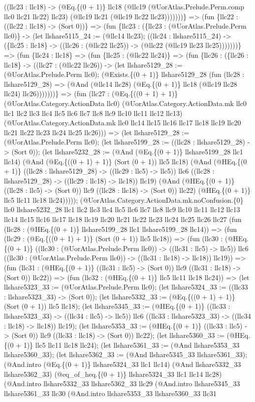 \documentclass[11pt]{article}
\begin{document}
((llc23 : llc18) -> (@Eq.\{(0 + 1)\} llc18 (@llc19 (@UorAtlas.Prelude.Perm.comp llc0 llc21 llc22) llc23) (@llc19 llc21 (@llc19 llc22 llc23)))))))\} => (fun \{llc22 : ((llc22 : llc18) -> (Sort 0))\} => (fun \{llc23 : (\{llc23 : (@UorAtlas.Prelude.Perm llc0)\} -> (let llshare5115\_24 := (@llc14 llc23); ((llc24 : llshare5115\_24) -> (\{llc25 : llc18\} -> ((llc26 : (@llc22 llc25)) -> (@llc22 (@llc19 llc23 llc25)))))))\} => (fun \{llc24 : llc18\} => (fun \{llc25 : (@llc22 llc24)\} => (fun \{llc26 : (\{llc26 : llc18\} -> ((llc27 : (@llc22 llc26)) -> (let llshare5129\_28 := (@UorAtlas.Prelude.Perm llc0); (@Exists.\{(0 + 1)\} llshare5129\_28 (fun (llc28 : llshare5129\_28) => (@And (@llc14 llc28) (@Eq.\{(0 + 1)\} llc18 (@llc19 llc28 llc24) llc26)))))))\} => (fun (llc27 : (@Eq.\{((0 + 1) + 1)\} (@UorAtlas.Category.ActionData llc0) (@UorAtlas.Category.ActionData.mk llc0 llc1 llc2 llc3 llc4 llc5 llc6 llc7 llc8 llc9 llc10 llc11 llc12 llc13) (@UorAtlas.Category.ActionData.mk llc0 llc14 llc15 llc16 llc17 llc18 llc19 llc20 llc21 llc22 llc23 llc24 llc25 llc26))) => (let llshare5129\_28 := (@UorAtlas.Prelude.Perm llc0); (let llshare5199\_28 := ((llc28 : llshare5129\_28) -> (Sort 0)); (let llshare5232\_28 := (@And (@Eq.\{(0 + 1)\} llshare5199\_28 llc1 llc14) (@And (@Eq.\{((0 + 1) + 1)\} (Sort (0 + 1)) llc5 llc18) (@And (@HEq.\{(0 + 1)\} ((llc28 : llshare5129\_28) -> ((llc29 : llc5) -> llc5)) llc6 ((llc28 : llshare5129\_28) -> ((llc29 : llc18) -> llc18)) llc19) (@And (@HEq.\{(0 + 1)\} ((llc28 : llc5) -> (Sort 0)) llc9 ((llc28 : llc18) -> (Sort 0)) llc22) (@HEq.\{(0 + 1)\} llc5 llc11 llc18 llc24))))); (@UorAtlas.Category.ActionData.mk.noConfusion.\{0\} llc0 llshare5232\_28 llc1 llc2 llc3 llc4 llc5 llc6 llc7 llc8 llc9 llc10 llc11 llc12 llc13 llc14 llc15 llc16 llc17 llc18 llc19 llc20 llc21 llc22 llc23 llc24 llc25 llc26 llc27 (fun (llc28 : (@HEq.\{(0 + 1)\} llshare5199\_28 llc1 llshare5199\_28 llc14)) => (fun (llc29 : (@Eq.\{((0 + 1) + 1)\} (Sort (0 + 1)) llc5 llc18)) => (fun (llc30 : (@HEq.\{(0 + 1)\} ((llc30 : (@UorAtlas.Prelude.Perm llc0)) -> ((llc31 : llc5) -> llc5)) llc6 ((llc30 : (@UorAtlas.Prelude.Perm llc0)) -> ((llc31 : llc18) -> llc18)) llc19)) => (fun (llc31 : (@HEq.\{(0 + 1)\} ((llc31 : llc5) -> (Sort 0)) llc9 ((llc31 : llc18) -> (Sort 0)) llc22)) => (fun (llc32 : (@HEq.\{(0 + 1)\} llc5 llc11 llc18 llc24)) => (let llshare5323\_33 := (@UorAtlas.Prelude.Perm llc0); (let llshare5324\_33 := ((llc33 : llshare5323\_33) -> (Sort 0)); (let llshare5332\_33 := (@Eq.\{((0 + 1) + 1)\} (Sort (0 + 1)) llc5 llc18); (let llshare5345\_33 := (@HEq.\{(0 + 1)\} ((llc33 : llshare5323\_33) -> ((llc34 : llc5) -> llc5)) llc6 ((llc33 : llshare5323\_33) -> ((llc34 : llc18) -> llc18)) llc19); (let llshare5353\_33 := (@HEq.\{(0 + 1)\} ((llc33 : llc5) -> (Sort 0)) llc9 ((llc33 : llc18) -> (Sort 0)) llc22); (let llshare5360\_33 := (@HEq.\{(0 + 1)\} llc5 llc11 llc18 llc24); (let llshare5361\_33 := (@And llshare5353\_33 llshare5360\_33); (let llshare5362\_33 := (@And llshare5345\_33 llshare5361\_33); (@And.intro (@Eq.\{(0 + 1)\} llshare5324\_33 llc1 llc14) (@And llshare5332\_33 llshare5362\_33) (@eq\_of\_heq.\{(0 + 1)\} llshare5324\_33 llc1 llc14 llc28) (@And.intro llshare5332\_33 llshare5362\_33 llc29 (@And.intro llshare5345\_33 llshare5361\_33 llc30 (@And.intro llshare5353\_33 llshare5360\_33 llc31 
\end{document}
